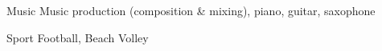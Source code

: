 

\begin{cvskills}

  \cvskill
    {Music} %
    {Music production (composition \& mixing), piano, guitar, saxophone} %

  \cvskill
    {Sport} %
    {Football, Beach Volley} %

\end{cvskills}
